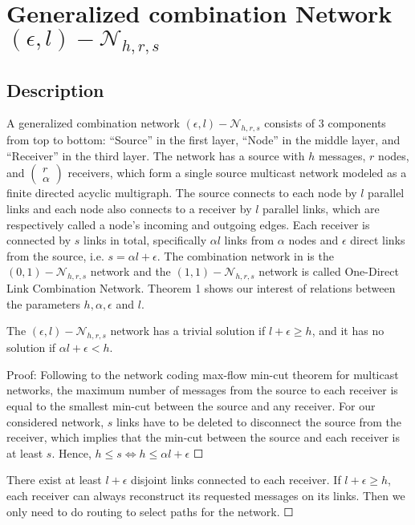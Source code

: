 \chapter{Generalized combination Network $(\epsilon,l)-\mathcal{N}_{h,r,s}$} \label{chap:general_network}

\section{Description \label{sec:Description_GCN}}

A generalized combination network $(\epsilon,l)-\mathcal{N}_{h,r,s}$
consists of 3 components from top to bottom: ``Source'' in the first
layer, ``Node'' in the middle layer, and ``Receiver'' in the third
layer. The network has a source with $h$ messages, $r$ nodes, and
$\left(\begin{array}{c}
r\\
\alpha
\end{array}\right)$ receivers, which form a single source multicast network modeled as
a finite directed acyclic multigraph. The source connects to each
node by $l$ parallel links and each node also connects to a receiver
by $l$ parallel links, which are respectively called a node's incoming
and outgoing edges. Each receiver is connected by $s$ links in total,
specifically $\alpha l$ links from $\alpha$ nodes and $\epsilon$
direct links from the source, i.e. $s=\alpha l+\epsilon$. The combination
network in \cite{Riis:2006} is the $(0,1)-\mathcal{N}_{h,r,s}$ network
and the $(1,1)-\mathcal{N}_{h,r,s}$ network is called One-Direct
Link Combination Network. Theorem 1 shows our interest of relations
between the parameters $h,\alpha,\epsilon$ and $l$.
\begin{thm}
\label{nw_parameters}The $(\epsilon,l)-\mathcal{N}_{h,r,s}$ network
has a trivial solution if $l+\epsilon\geq h$, and it has no solution
if $\alpha l+\epsilon<h$. 

Proof: Following to the network coding max-flow min-cut theorem for
multicast networks, the maximum number of messages from the source
to each receiver is equal to the smallest min-cut between the source
and any receiver. For our considered network, $s$ links have to be
deleted to disconnect the source from the receiver, which implies
that the min-cut between the source and each receiver is at least
$s$. Hence, $h\leq s\Leftrightarrow h\leq\alpha l+\epsilon$ $\Square$

There exist at least $l+\epsilon$ disjoint links connected to each
receiver. If $l+\epsilon\geq h$, each receiver can always reconstruct
its requested messages on its links. Then we only need to do routing
to select paths for the network. $\Square$
\end{thm}
